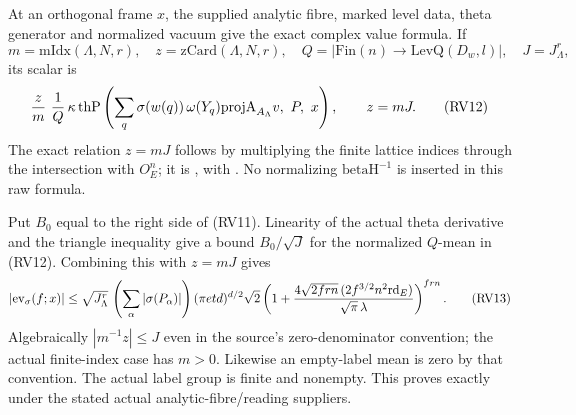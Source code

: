 At an orthogonal frame \(x\), the supplied analytic fibre,
marked level data, theta generator and normalized vacuum give
the exact complex value formula. If
\[
 m=\mathrm{mIdx}(\Lambda,N,r),\quad
 z=\mathrm{zCard}(\Lambda,N,r),\quad
 Q=|\mathrm{Fin}(n)\to\mathrm{LevQ}(D_w,l)|,\quad
 J=J_\Lambda^r,
\]
its scalar is
\[
 {z\over m}\ {1\over Q}\,
 \kappa\,\mathrm{thP}
       \left(\sum_q\sigma(w(q))\,
                  \omega(Y_q)\mathrm{projA}_{A_\Lambda}v,\ P,\ x\right),
              \qquad z=mJ .
 \tag{RV12}\label{eq:sr-source-raw-reading-scalar}
\]
The exact relation \(z=mJ\) follows by multiplying the finite
lattice indices through the intersection with \(O_E^n\);
it is , with .
No normalizing \(\mathrm{betaH}^{-1}\) is inserted in this raw
formula.

Put \(B_0\) equal to the right side of (RV11).
Linearity of the actual theta derivative and the triangle
inequality give a bound \(B_0/\sqrt J\) for the normalized
\(Q\)-mean in (RV12).
Combining this with \(z=mJ\) gives
\[
 \left|\operatorname{ev}_\sigma(f;x)\right|
 \le \sqrt{J_\Lambda^r}\,
       \left(\sum_\alpha|\sigma(P_\alpha)|\right)
       (\pi e t d)^{d/2}\sqrt2
 \left(1+
 {4\sqrt{2frn}\,(2f^{3/2}n^2\mathrm{rd}_E)
                       \over\sqrt\pi\,\lambda}\right)^{frn}.
 \tag{RV13}\label{eq:sr-source-raw-value-bound}
\]
Algebraically \(|m^{-1}z|\le J\) even in the source's
zero-denominator convention; the actual finite-index case has
\(m>0\).
Likewise an empty-label mean is zero by that convention.
The actual label group is finite and nonempty.
This proves exactly
under the stated actual analytic-fibre/reading suppliers.

